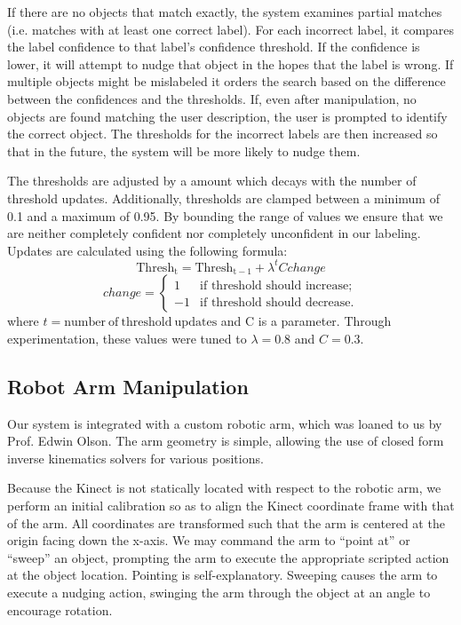 \documentclass[11pt]{article}
\begin{document}
If there are no objects that match exactly, the system examines partial
matches (i.e. matches with at least one correct label). For each incorrect label, it compares the
label confidence to that label's confidence threshold. If the confidence is
lower, it will attempt to nudge that object in the hopes that the label
is wrong. If multiple objects might be mislabeled it orders the search
based on the difference between the confidences and the thresholds. If, even after
manipulation, no objects are found matching the user description, the user is
prompted to identify the correct object. The thresholds for the incorrect
labels are then increased so that in the future, the system will be more
likely to nudge them.

The thresholds are adjusted by a amount which decays with the number of
threshold updates. Additionally, thresholds are clamped between a minimum of
0.1 and a maximum of 0.95. By bounding the range of values we ensure that we are neither completely confident nor completely unconfident in our labeling. 
Updates are calculated using the following formula:
$$\mathrm{Thresh_{t}} = \mathrm{Thresh_{t-1}} + \lambda^t C change$$
\[change = \left\{ \begin{array}{ll}
         1 & \mbox{if threshold should increase};\\
         -1 & \mbox{if threshold should decrease}.\end{array} \right. \]
where $t= \mathrm{number~of~threshold~updates}$ and C is a parameter. Through
experimentation, these values were tuned to $\lambda = 0.8$ and $C = 0.3$.

\subsection{Robot Arm Manipulation}
Our system is integrated with a custom robotic arm, which was loaned to us by Prof.
Edwin Olson. The arm geometry is simple, allowing the use of closed form inverse
kinematics solvers for various positions.

Because the Kinect is not statically located with respect to the robotic arm,
we perform an initial calibration so as to align the Kinect coordinate
frame with that of the arm. All coordinates are transformed such that the arm
is centered at the origin facing down the x-axis. We
may command the arm to ``point at'' or ``sweep'' an object, prompting the arm
to execute the appropriate scripted action at the object location. Pointing is
self-explanatory. Sweeping causes the arm to execute a nudging action,
swinging the arm through the object at an angle to encourage rotation.
\end{document}
